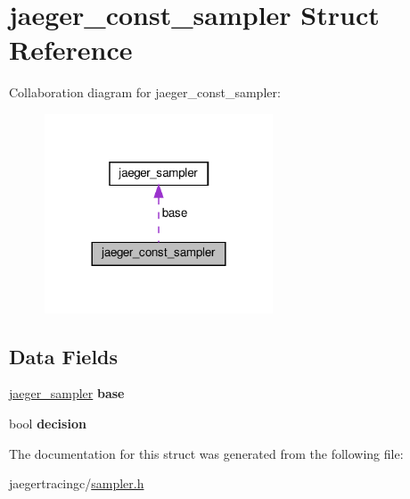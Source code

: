 \hypertarget{structjaeger__const__sampler}{}\section{jaeger\+\_\+const\+\_\+sampler Struct Reference}
\label{structjaeger__const__sampler}


Collaboration diagram for jaeger\+\_\+const\+\_\+sampler\+:\nopagebreak
\begin{figure}[H]
\begin{center}
\leavevmode
\includegraphics[width=192pt]{structjaeger__const__sampler__coll__graph}
\end{center}
\end{figure}
\subsection*{Data Fields}
\begin{DoxyCompactItemize}
\item 
\mbox{\label{structjaeger__const__sampler_a1346f1dc941bcd9eed5f790d4ab3d9e9}} 
\mbox{\hyperlink{structjaeger__sampler}{jaeger\+\_\+sampler}} {\bfseries base}
\item 
\mbox{\label{structjaeger__const__sampler_a6505c6a75f08c99b9c786e142bee3d41}} 
bool {\bfseries decision}
\end{DoxyCompactItemize}


The documentation for this struct was generated from the following file\+:\begin{DoxyCompactItemize}
\item 
jaegertracingc/\mbox{\hyperlink{sampler_8h}{sampler.\+h}}\end{DoxyCompactItemize}

